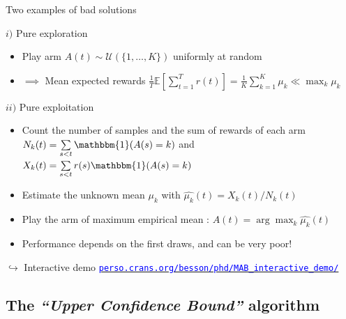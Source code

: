 \documentclass[11pt,english,ignorenonframetext,]{beamer}
\begin{document}
\begin{frame}{Two examples of bad solutions}

  \begin{exampleblock}{$i)$ Pure exploration \dXey{}}
    \begin{itemize}
      \item
      Play arm $A(t) \sim \mathcal{U}(\{1,\dots,K\})$ uniformly at random
      \item
      $\implies$ Mean expected rewards
      $ \frac{1}{T} \mathbb{E}\left[ \sum\limits_{t=1}^T r(t) \right] = \frac{1}{K} \sum\limits_{k=1}^K \mu_k \ll \max_k \mu_k$
    \end{itemize}
  \end{exampleblock}

  \pause

  \begin{exampleblock}{$ii)$ Pure exploitation \dXey{}}
    \begin{itemize}
      \item
        Count the number of samples and the sum of rewards of each arm $N_k(t) = \sum\limits_{s < t} \mathbbm{1}(A(s)=k)$ and $X_k(t) = \sum\limits_{s < t} r(s) \mathbbm{1}(A(s)=k)$
      \item
        Estimate the \alert{unknown} mean $\mu_k$ with $\widehat{\mu_k}(t) = X_k(t) / N_k(t)$
      \item
        Play the arm of maximum empirical mean : $A(t) = \arg\max_k \widehat{\mu_k}(t)$
      \item
        Performance depends on the first draws, and can be very poor!
    \end{itemize}
  \end{exampleblock}
  \vspace*{-10pt}
  \begin{tiny}
    $\hookrightarrow$
    Interactive demo
    \href{https://perso.crans.org/besson/phd/MAB_interactive_demo/}{\textcolor{blue}{\texttt{perso.crans.org/besson/phd/MAB\_interactive\_demo/}}}
  \end{tiny}

\end{frame}


\subsection{\hfill{}The \emph{``Upper Confidence Bound''} algorithm\hfill{}}
\end{document}

